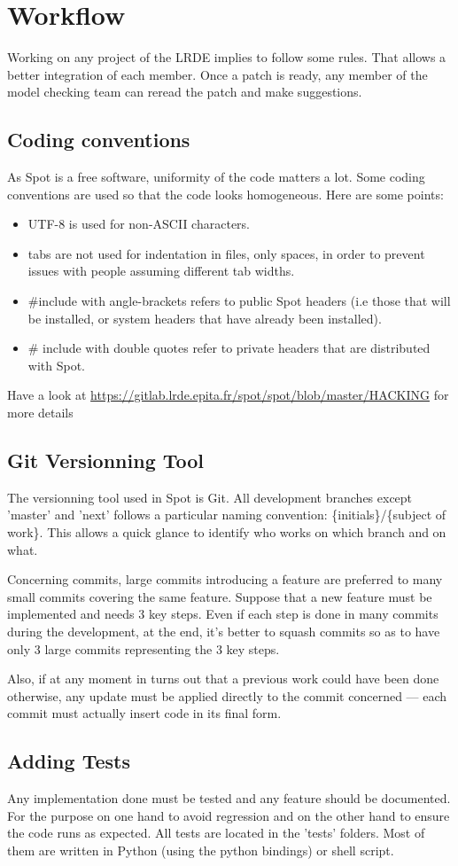 \section{Workflow}
Working on any project of the LRDE implies to follow some rules. That allows a better integration of each
member. Once a patch is ready, any member of the model checking team can reread the patch and make
suggestions.

\subsection{Coding conventions}
As Spot is a free software, uniformity of the code matters a lot. Some coding conventions are used so that
the code looks homogeneous. Here are some points:
\begin{itemize}
 \item UTF-8 is used for non-ASCII characters.
 \item tabs are not used for indentation in files, only spaces, in order to prevent issues with people
 assuming different tab widths.
 \item \#include with angle-brackets refers to public Spot headers (i.e those that will be installed, or
 system headers that have already been installed).
 \item \# include with double quotes refer to private headers that are distributed with Spot.
\end{itemize}

Have a look at \url{https://gitlab.lrde.epita.fr/spot/spot/blob/master/HACKING} for more details

\subsection{Git Versionning Tool}
The versionning tool used in Spot is Git. All development branches except 'master' and 'next' follows a
particular naming convention: \{initials\}/\{subject of work\}. This allows a quick glance to identify
who works on which branch and on what.

Concerning commits, large commits introducing a feature are preferred to many small commits covering
the same feature. Suppose that a new feature must be implemented and needs 3 key steps. Even if each step
is done in many commits during the development, at the end, it's better to squash commits so as to have
only 3 large commits representing the 3 key steps.

Also, if at any moment in turns out that a previous work
could have been done otherwise, any update must be applied directly to the commit concerned --- each commit
must actually insert code in its final form.

\subsection{Adding Tests}
Any implementation done must be tested and any feature should be documented. For the purpose on one hand
to avoid regression and on the other hand to ensure the code runs as expected. All tests are located in
the 'tests' folders. Most of them are written in Python (using the python bindings) or shell script.

